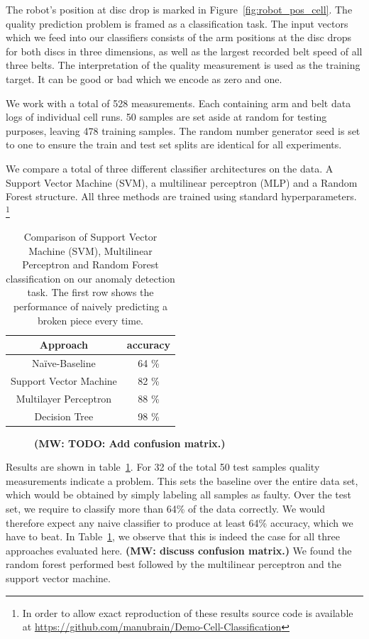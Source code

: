 \documentclass[5p,times,procedia]{elsarticle}
\newcommand{\MW}[1]{{\color{teal} {\bf (MW: #1)}}}
\begin{document}
The robot's position at disc drop is marked in 
Figure~\ref{fig:robot_pos_cell}. The quality prediction problem is 
framed as a classification task. The input vectors which we feed into our
classifiers consists of the arm positions at the disc drops for both
discs in three dimensions, as well as the largest recorded belt speed
of all three belts. The interpretation of the quality measurement is 
used as the training target. It can be good or bad which we encode as 
zero and one.

We work with a total of 528 measurements. Each containing arm and belt data
logs of individual cell runs. 50 samples are set aside at random for testing 
purposes, leaving 478 training samples. The random number generator seed is
set to one to ensure the train and test set splits are identical 
for all experiments.

We compare a total of three different classifier architectures on the data.
A Support Vector Machine (SVM), a multilinear perceptron (MLP) and a Random Forest
structure. All three methods are trained using standard hyperparameters.
\footnote{In order to allow exact reproduction of these results source
code is available at \url{https://github.com/manubrain/Demo-Cell-Classification}}
\begin{table}
       \centering
       \begin{tabular}{ c c } \toprule
              Approach         & accuracy \\ \midrule
              Na\"ive-Baseline & 64 \% \\
              Support Vector Machine & 82 \% \\
              Multilayer Perceptron & 88 \% \\
              Decision Tree         & 98 \% \\ \bottomrule
       \end{tabular}
       \caption{Comparison of Support Vector Machine (SVM), Multilinear Perceptron and 
                Random Forest classification on our anomaly detection task. 
                The first row shows the performance of naively predicting a broken piece
                every time.}
       \label{tab:class_comp}
\end{table}

\begin{figure}
\caption{\MW{TODO: Add confusion matrix.}}
\end{figure}

Results are shown in table~\ref{tab:class_comp}. For 32 of the total 50 test samples
quality measurements indicate a problem. This sets the 
baseline over the entire data set, which would be obtained by simply labeling all samples
as faulty. Over the test set, we require to classify more than 64\% of the data correctly.
We would therefore expect any naive classifier to produce at least 64\% accuracy, which we have to beat. In Table~\ref{tab:class_comp}, we observe that this is indeed the case for all three approaches evaluated here.
\MW{discuss confusion matrix.}
We found the random forest performed best followed by the multilinear
perceptron and the support vector machine. 
\end{document}
